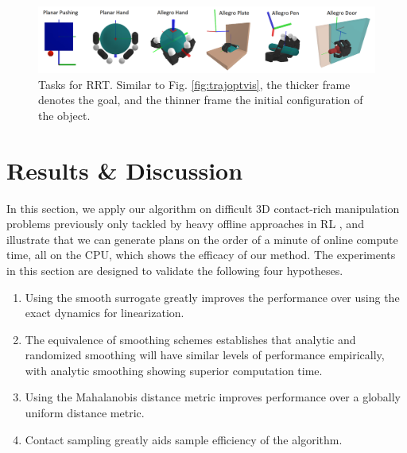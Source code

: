 \begin{figure}
\centering\includegraphics[width = 1.0\linewidth]{figures/03_contact_rich_planning/rrt_systems_pagewide.png}
\caption{Tasks for RRT. Similar to Fig. \ref{fig:trajoptvis}, the thicker frame denotes the goal, and the thinner frame the initial configuration of the object.}
\label{fig:rrt_tasks}
\end{figure}



\section{Results \& Discussion \label{sec:rrt_results}}
\noindent In this section, we apply our algorithm on difficult 3D contact-rich manipulation problems previously only tackled by heavy offline approaches in RL \cite{rajeswaran2018learning, chen2022system}, and illustrate that we can generate plans on the order of a minute of online compute time, all on the CPU, which shows the efficacy of our method.
The experiments in this section are designed to validate the following four hypotheses.
\begin{enumerate}
\item Using the smooth surrogate greatly improves the performance over using the exact dynamics for linearization.
\item The equivalence of smoothing schemes establishes that analytic and randomized smoothing will have similar levels of performance empirically, with analytic smoothing showing superior computation time.
\item Using the Mahalanobis distance metric improves performance over a globally uniform distance metric.
\item Contact sampling greatly aids sample efficiency of the algorithm.
\end{enumerate}

